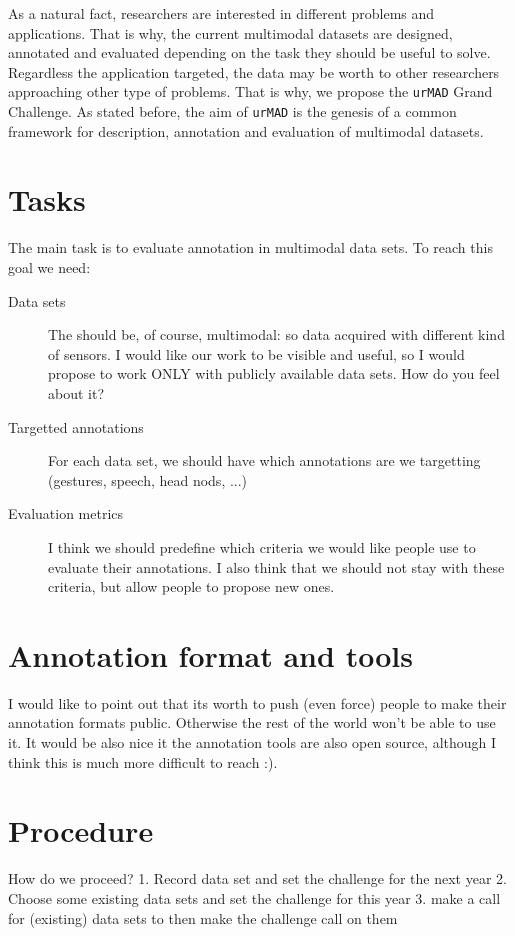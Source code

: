 \documentclass{article}
\begin{document}
As a natural fact, researchers are interested in different problems and applications. That is why, the current
multimodal datasets are designed, annotated and evaluated depending on the task they should be useful to solve.
Regardless the application targeted, the data may be worth to other researchers approaching other type of problems.
That is why, we propose the \texttt{urMAD} Grand Challenge. As stated before, the aim of \texttt{urMAD} is the genesis
of a common framework for description, annotation and evaluation of multimodal datasets.

 \section{Tasks}
The main task is to evaluate annotation in multimodal data sets. To reach this goal we need:
\begin{description}
 \item [Data sets] The should be, of course, multimodal: so data acquired with different kind of sensors. I would like
our work to be visible and useful, so I would propose to work ONLY with publicly available data sets. How do you feel
about it?
 \item [Targetted annotations] For each data set, we should have which annotations are we targetting (gestures, speech,
head nods, ...)
 \item [Evaluation metrics] I think we should predefine which criteria we would like people use to evaluate their
annotations. I also think that we should not stay with these criteria, but allow people to propose new ones.
\end{description}

 \section{Annotation format and tools}
I would like to point out that its worth to push (even force) people to make their annotation formats public. Otherwise
the rest of the world won't be able to use it. It would be also nice it the annotation tools are also open source,
although I think this is much more difficult to reach :).

 \section{Procedure}
How do we proceed?
1. Record data set and set the challenge for the next year
2. Choose some existing data sets and set the challenge for this year
3. make a call for (existing) data sets to then make the challenge call on them
\end{document}
